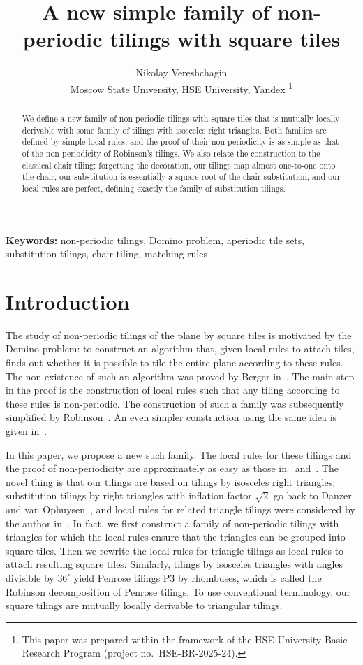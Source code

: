 \documentclass[11pt]{article}
\title{A new simple family of non-periodic tilings with square tiles}
\author{Nikolay Vereshchagin\\
Moscow State University, HSE University, Yandex%
\thanks{This paper was prepared within the framework of the HSE University Basic Research Program (project no.~HSE-BR-2025-24).}}
\theoremstyle{remark}
\begin{document}
\maketitle
\begin{abstract}
We define a new family of non-periodic tilings with square tiles that is mutually locally derivable with some family of tilings with isosceles right triangles. Both families are defined by simple local rules, and the proof of their non-periodicity is as simple as that of the non-periodicity of Robinson's tilings. We also relate the construction to the classical chair tiling: forgetting the decoration, our tilings map almost one-to-one onto the chair, our substitution is essentially a square root of the chair substitution, and our local rules are perfect, defining exactly the family of substitution tilings.
\end{abstract}  
  \textbf{Keywords:}
non-periodic tilings, Domino problem, aperiodic tile sets, substitution tilings, chair tiling, matching rules

\section{Introduction}

The study of non-periodic tilings of the plane by square tiles is motivated by the Domino problem: 
to construct an algorithm that, given local rules to attach  tiles, 
finds out whether it is possible to tile the entire plane according to these rules. 
The non-existence of such an algorithm was proved by Berger in~\cite{berger}. 
The main step in the proof is the construction of local rules such that any tiling according to these rules 
is non-periodic. The construction of such a family was subsequently 
simplified by Robinson~\cite{rob}. An even simpler construction using the 
same idea is given in~\cite{dls}.

In this paper, we propose a new such family. 
The local rules for these tilings and the proof of non-periodicity are approximately as easy as 
those in~\cite{rob} and~\cite{dls}. The novel thing is that our tilings are based
on tilings by isosceles right triangles; substitution tilings by right
triangles with inflation factor $\sqrt2$ go back to Danzer and van
Ophuysen~\cite{lo}, and local rules for related triangle tilings were considered
by the author in~\cite{ver}.
In fact, we first construct a family of non-periodic tilings with
triangles for which the local rules ensure that the triangles
can be grouped  into square tiles.
Then we rewrite the local rules for triangle tilings as local rules to attach resulting square tiles. 
Similarly, tilings by isosceles triangles with angles divisible by $36^\circ$ yield Penrose tilings P3 by rhombuses, which is called the Robinson decomposition of Penrose tilings. To use conventional terminology,
our square tilings are mutually locally derivable to triangular tilings.
\end{document}
